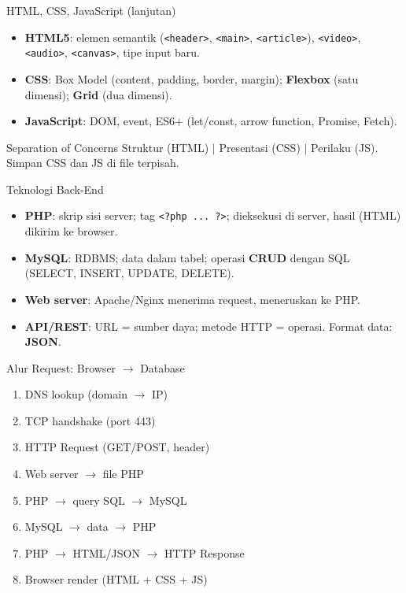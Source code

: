 \documentclass[handout]{beamer}
\begin{document}
\begin{frame}{HTML, CSS, JavaScript (lanjutan)}
	\begin{itemize}
		\item \textbf{HTML5}: elemen semantik (\texttt{<header>}, \texttt{<main>}, \texttt{<article>}), \texttt{<video>}, \texttt{<audio>}, \texttt{<canvas>}, tipe input baru.
		\item \textbf{CSS}: Box Model (content, padding, border, margin); \textbf{Flexbox} (satu dimensi); \textbf{Grid} (dua dimensi).
		\item \textbf{JavaScript}: DOM, event, ES6+ (let/const, arrow function, Promise, Fetch).
	\end{itemize}
	\begin{block}{Separation of Concerns}
		Struktur (HTML) $|$ Presentasi (CSS) $|$ Perilaku (JS). Simpan CSS dan JS di file terpisah.
	\end{block}
\end{frame}

\begin{frame}{Teknologi Back-End}
	\begin{itemize}
		\item \textbf{PHP}: skrip sisi server; tag \texttt{<?php ... ?>}; dieksekusi di server, hasil (HTML) dikirim ke browser.
		\item \textbf{MySQL}: RDBMS; data dalam tabel; operasi \textbf{CRUD} dengan SQL (SELECT, INSERT, UPDATE, DELETE).
		\item \textbf{Web server}: Apache/Nginx menerima request, meneruskan ke PHP.
		\item \textbf{API/REST}: URL = sumber daya; metode HTTP = operasi. Format data: \textbf{JSON}.
	\end{itemize}
\end{frame}

\begin{frame}{Alur Request: Browser $\to$ Database}
	\begin{enumerate}
		\item DNS lookup (domain $\to$ IP)
		\item TCP handshake (port 443)
		\item HTTP Request (GET/POST, header)
		\item Web server $\to$ file PHP
		\item PHP $\to$ query SQL $\to$ MySQL
		\item MySQL $\to$ data $\to$ PHP
		\item PHP $\to$ HTML/JSON $\to$ HTTP Response
		\item Browser render (HTML + CSS + JS)
	\end{enumerate}
\end{frame}
\end{document}

